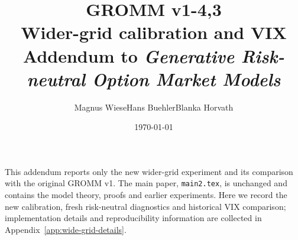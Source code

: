 \documentclass[11pt]{article}
\title{\textbf{GROMM v1-4,3}\\[6pt]
  \large Wider-grid calibration and VIX\\
  Addendum to \emph{Generative Risk-neutral Option Market Models}}
\author{Magnus Wiese\qquad Hans Buehler\qquad Blanka Horvath}
\date{\today}
\begin{document}
\maketitle

This addendum reports only the new wider-grid experiment and its comparison
with the original GROMM v1. The main paper, \texttt{main2.tex}, is unchanged
and contains the model theory, proofs and earlier experiments. Here we
record the new calibration, fresh risk-neutral diagnostics and historical
VIX comparison; implementation details and reproducibility information
are collected in Appendix~\ref{app:wide-grid-details}.



\clearpage
\appendix
\begingroup
\small

\endgroup

\clearpage

\end{document}
